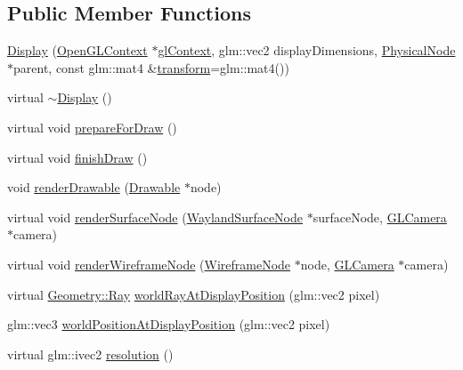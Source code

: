 \subsection*{Public Member Functions}
\begin{DoxyCompactItemize}
\item 
\hyperlink{classmotorcar_1_1Display_a2f7466d55b00caa97751ee242e0c633c}{Display} (\hyperlink{classmotorcar_1_1OpenGLContext}{Open\-G\-L\-Context} $\ast$\hyperlink{classmotorcar_1_1Display_a884dd0b78dbecee82a33eb6d26a2a403}{gl\-Context}, glm\-::vec2 display\-Dimensions, \hyperlink{classmotorcar_1_1PhysicalNode}{Physical\-Node} $\ast$parent, const glm\-::mat4 \&\hyperlink{classmotorcar_1_1SceneGraphNode_ad96e79fdd739ac8223a3128003be391a}{transform}=glm\-::mat4())
\item 
virtual \hyperlink{classmotorcar_1_1Display_ac2607a6bb236c55547a4223d40d85d1f}{$\sim$\-Display} ()
\item 
virtual void \hyperlink{classmotorcar_1_1Display_a0b26d9162f4f8f0848af408791be631c}{prepare\-For\-Draw} ()
\item 
virtual void \hyperlink{classmotorcar_1_1Display_a162b721d9c039887fc37b6a090ff1074}{finish\-Draw} ()
\item 
void \hyperlink{classmotorcar_1_1Display_a19ffdb900228ff521433717c845b32a4}{render\-Drawable} (\hyperlink{classmotorcar_1_1Drawable}{Drawable} $\ast$node)
\item 
virtual void \hyperlink{classmotorcar_1_1Display_a1c329c8587b03aa7dba1dd986f719189}{render\-Surface\-Node} (\hyperlink{classmotorcar_1_1WaylandSurfaceNode}{Wayland\-Surface\-Node} $\ast$surface\-Node, \hyperlink{classmotorcar_1_1GLCamera}{G\-L\-Camera} $\ast$camera)
\item 
virtual void \hyperlink{classmotorcar_1_1Display_aa2dbfd4fef12770edc9c0695b0b0470f}{render\-Wireframe\-Node} (\hyperlink{classmotorcar_1_1WireframeNode}{Wireframe\-Node} $\ast$node, \hyperlink{classmotorcar_1_1GLCamera}{G\-L\-Camera} $\ast$camera)
\item 
virtual \hyperlink{structmotorcar_1_1Geometry_1_1Ray}{Geometry\-::\-Ray} \hyperlink{classmotorcar_1_1Display_a9af842ec6ce47cdc901cb0310b0ef126}{world\-Ray\-At\-Display\-Position} (glm\-::vec2 pixel)
\item 
glm\-::vec3 \hyperlink{classmotorcar_1_1Display_ac3a8d4538e88df5b2bee043504620447}{world\-Position\-At\-Display\-Position} (glm\-::vec2 pixel)
\item 
virtual glm\-::ivec2 \hyperlink{classmotorcar_1_1Display_a3fa06b92ceb44855394c61b24e986153}{resolution} ()

\end{DoxyCompactItemize}
